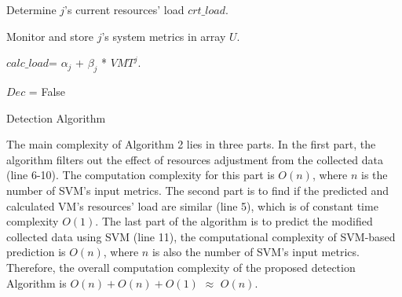 \documentclass[twocolumn]{bmcart}%
\begin{document}
\begin{algorithm}[h]
\LinesNumbered


{
Determine $j$'s current resources' load $crt\_load$.


Monitor and store $j$'s system metrics in array $U$.


$calc\_load$= $\alpha_{j}$ + $\beta_{j}$ * $VMT^{j}$.

   }
\Else
{
$Dec$ = False
}


\caption{Detection Algorithm}
\end{algorithm}

The main complexity of Algorithm 2 lies in three parts. In the first part, the algorithm filters out the effect of resources adjustment from the collected data (line 6-10). The computation complexity for this part is $O(n)$, where $n$ is the number of SVM's input metrics. The second part is to find if the predicted and calculated VM's resources' load are similar (line 5), which is of constant time complexity $O(1)$. The last part of the algorithm is to predict the modified collected data using SVM (line 11), the computational complexity of SVM-based prediction is $O(n)$, where $n$ is also the number of SVM's input metrics. Therefore, the overall computation complexity of the proposed detection Algorithm is $O(n) + O(n) + O(1)$ $\approx$ $O(n)$.
\end{document}
